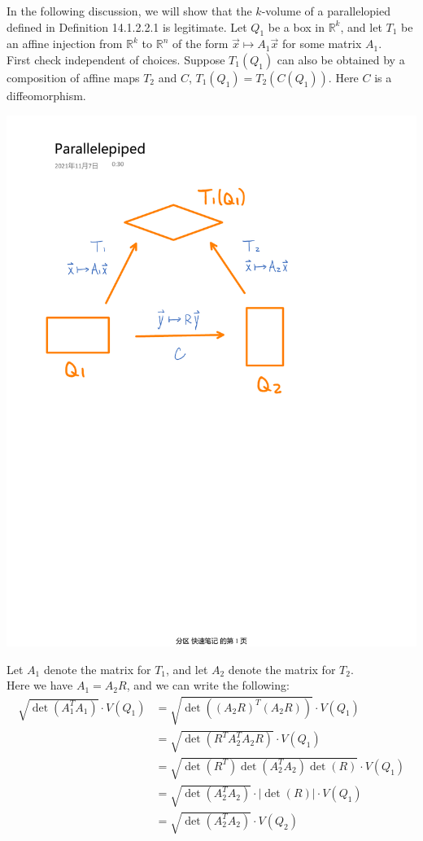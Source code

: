 \documentclass[15pt]{book}
\theoremstyle{break}
\theoremstyle{break}
\newcommand{\R}{\mathbb{R}}
\begin{document}
In the following discussion, we will show that the $k$-volume of a parallelopied defined in Definition 14.1.2.2.1 is legitimate. Let $Q_1$ be a box in $\R^k$, and let $T_1$ be an affine injection from $\R^k$ to $\R^n$ of the form $\vec{x}\mapsto A_1\vec{x}$ for some matrix $A_1$.\\

First check independent of choices. Suppose $T_1(Q_1)$ can also be obtained by a composition of affine maps $T_2$ and $C$, $T_1(Q_1) = T_2(C(Q_1))$. Here $C$ is a diffeomorphism. \\
\begin{center}
\includegraphics[scale=0.5]{parallpied.pdf}
\end{center}
Let $A_1$ denote the matrix for $T_1$, and let $A_2$ denote the matrix for $T_2$. \\
Here we have $A_1 = A_2 R$, and we can write the following:
\begin{align*}
\sqrt{\det(A_1^TA_1)} \cdot V(Q_1) &= \sqrt{\det((A_2R)^T(A_2R))} \cdot V(Q_1) \\&= \sqrt{\det(R^TA_2^TA_2R)} \cdot V(Q_1) \\&= \sqrt{\det(R^T)\det(A_2^TA_2)\det(R)}\cdot V(Q_1) \\&= \sqrt{\det(A_2^TA_2)}\cdot |\det(R)|\cdot V(Q_1) \\&= \sqrt{\det(A_2^TA_2)}\cdot V(Q_2)
\end{align*}
\end{document}
